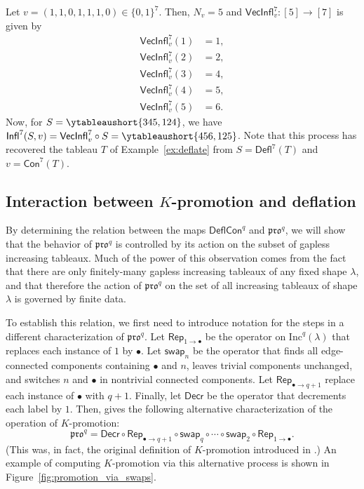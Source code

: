 \documentclass[12pt]{amsart}
\theoremstyle{definition}
\newenvironment{example}
  {\pushQED{\qed}\renewcommand{\qedsymbol}{$\diamondsuit$}\examplex}
  {\popQED\endexamplex}
\theoremstyle{remark}
\numberwithin{equation}{section}
\newcommand{\inc}{\ensuremath{\mathrm{Inc}}}
\newcommand{\pro}{\mathfrak{pro}}
\newcommand{\swap}{\ensuremath{\mathsf{swap}}}
\newcommand{\decr}{\ensuremath{\mathsf{Decr}}}
\newcommand{\rep}{\ensuremath{\mathsf{Rep}}}
\newcommand{\deflate}{\ensuremath{\mathsf{Defl}}}
\newcommand{\inflate}{\ensuremath{\mathsf{VecInfl}}}
\newcommand{\tinflate}{\ensuremath{\mathsf{Infl}}}
\newcommand{\content}{\ensuremath{\mathsf{Con}}}
\newcommand{\compress}{\ensuremath{\mathsf{DeflCon}}}
\begin{document}
\begin{example}\label{ex:reinflate}
Let $v = (1,1,0,1,1,1,0) \in \{0,1\}^7$. Then, $N_v = 5$ and $\inflate^7_v : [5] \to [7]$ is given by 
\begin{align*}
\inflate^7_v(1) &= 1, \\
\inflate^7_v(2) &= 2, \\
\inflate_v^7(3) &= 4, \\
\inflate_v^7(4) &= 5, \\
\inflate_v^7(5) &= 6. 
\end{align*}
Now, for $S = \ytableaushort{345,124}$, we have $\tinflate^7(S,v) = \inflate^7_v \circ S = \ytableaushort{456,125}$. Note that this process has recovered the tableau $T$ of Example~\ref{ex:deflate} from $S=\deflate^7(T)$ and $v=\content^7(T)$.
\end{example}

\subsection{Interaction between $K$-promotion and deflation}
By determining the relation between the maps $\compress^q$ and $\pro^q$, we will show that the behavior of $\pro^q$ is controlled by its action on the subset of gapless increasing tableaux. Much of the power of this observation comes from the fact that there are only finitely-many gapless increasing tableaux of any fixed shape $\lambda$, and that therefore the action of $\pro^q$ on the set of all increasing tableaux of shape $\lambda$ is governed by finite data.


To establish this relation, we first need to introduce notation for the steps in a different characterization of $\pro^q$. Let $\rep_{1 \rightarrow \bullet}$ be the operator on $\inc^q(\lambda)$ that replaces each instance of $1$ by $\bullet$. Let $\swap_n$ be the operator that finds all edge-connected components containing $\bullet$ and $n$, leaves trivial components unchanged, and switches $n$ and $\bullet$ in nontrivial connected components. Let $\rep_{\bullet \rightarrow q+1}$ replace each instance of $\bullet$ with $q+1$. Finally, let $\decr$ be the operator that decrements each label by $1$. Then, \cite[Proposition~2.4]{DPS} gives the following alternative characterization of the operation of $K$-promotion: 
\begin{equation}\label{eq:kprodef2}
\pro^q = \decr \circ \rep_{\bullet \rightarrow q+1} \circ \swap_q \circ \cdots \circ \swap_2 \circ \rep_{1 \rightarrow \bullet}.
\end{equation}
 (This was, in fact, the original definition of $K$-promotion introduced in \cite{Pechenik}.) An example of computing $K$-promotion via this alternative process is shown in Figure~\ref{fig:promotion_via_swaps}.
 
\end{document}
